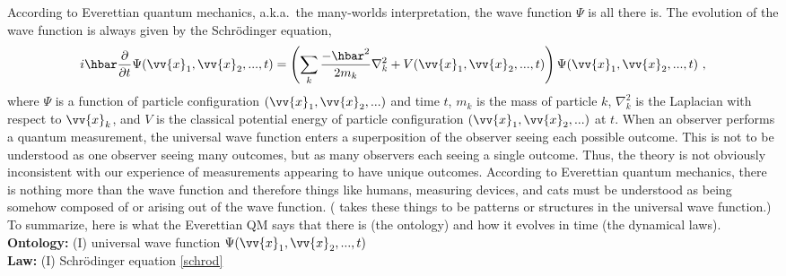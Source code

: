 \documentclass[12pt,secnumarabic,balancelastpage,amsmath,amssymb,nofootinbib]{article}
\begin{document}
According to Everettian quantum mechanics, a.k.a.\ the many-worlds interpretation, the wave function $\Psi$ is all there is.  The evolution of the wave function is always given by the Schr\"{o}dinger equation,
\begin{equation}
i\hbar\frac{\partial}{\partial t}\Psi(\vv{x}_1,\vv{x}_2,...,t)
=\left(\sum_k{\frac{-\hbar^2}{2 m_k}\nabla_k^2}+V(\vv{x}_1,\vv{x}_2,...,t)\right)\Psi(\vv{x}_1,\vv{x}_2,...,t)\ ,
\label{schrod}
\end{equation}
where $\Psi$ is a function of particle configuration $(\vv{x}_1,\vv{x}_2,...)$ and time $t$, $m_k$ is the mass of particle $k$, $\nabla_k^2$ is the Laplacian with respect to $\vv{x}_k$, and $V$ is the classical potential energy of particle configuration $(\vv{x}_1,\vv{x}_2,...)$ at $t$.  When an observer performs a quantum measurement, the universal wave function enters a superposition of the observer seeing each possible outcome.  This is not to be understood as one observer seeing many outcomes, but as many observers each seeing a single outcome. Thus, the theory is not obviously inconsistent with our experience of measurements appearing to have unique outcomes.  According to Everettian quantum mechanics, there is nothing more than the wave function and therefore things like humans, measuring devices, and cats must be understood as being somehow composed of or arising out of the wave function.  (\citealp{wallace2003, wallace2012} takes these things to be patterns or structures in the universal wave function.)  To summarize, here is what the Everettian QM says that there is (the ontology) and how it evolves in time (the dynamical laws).
\vspace*{6 pt}\\\hspace*{1.2cm}\textbf{Ontology:} (I) universal wave function $\Psi(\vv{x}_1,\vv{x}_2,...,t)$
\\\hspace*{1.2cm}\textbf{Law:} (I) Schr\"{o}dinger equation \eqref{schrod}
\vspace*{6 pt}
\end{document}
